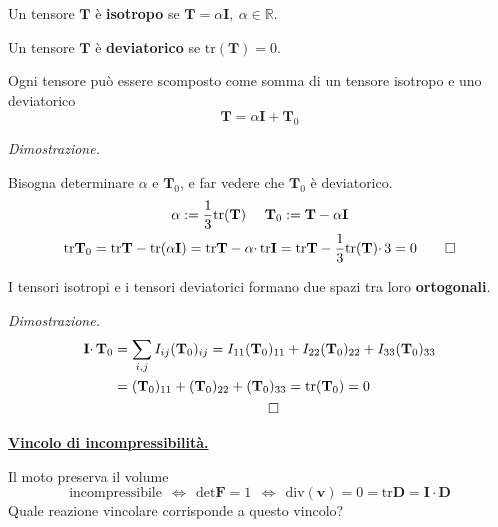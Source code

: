 \documentclass[10pt,a4paper,twoside]{book}
\begin{document}

\begin{oss}
Un tensore $\mathbf{T}$ è \textbf{isotropo} se $\mathbf{T} =\alpha \mathbf{I} ,\ \alpha \in \mathbb{R}$.

Un tensore $\mathbf{T}$ è \textbf{deviatorico} se $\mathrm{tr}(\mathbf{T}) =0$.

Ogni tensore può essere scomposto come somma di un tensore isotropo e uno deviatorico
\begin{equation*}
\boxed{\mathbf{T} =\alpha \mathbf{I} +\mathbf{T}_{0}}
\end{equation*}
\end{oss}
\textit{Dimostrazione.}

Bisogna determinare $\alpha $ e $\mathbf{T}_{0}$, e far vedere che $\mathbf{T}_{0}$ è deviatorico.
\begin{gather*}
\alpha :=\frac{1}{3}\mathrm{tr}(\mathbf{T}) \ \ \ \ \mathbf{T}_{0} :=\mathbf{T} -\alpha \mathbf{I}\\
\mathrm{tr}\mathbf{T}_{0} =\mathrm{tr}\mathbf{T} -\mathrm{tr}( \alpha \mathbf{I}) =\mathrm{tr}\mathbf{T} -\alpha \cdotp \mathrm{tr}\mathbf{I} =\mathrm{tr}\mathbf{T} -\frac{1}{3}\mathrm{tr(}\mathbf{T}\mathrm{)} \cdotp 3=0\qed 
\end{gather*}

\begin{oss}
I tensori isotropi e i tensori deviatorici formano due spazi tra loro \textbf{ortogonali}.
\end{oss}
\textit{Dimostrazione.}
\begin{gather*}
\begin{aligned}
\mathbf{I} \cdotp \mathbf{T}_{0} & =\sum _{i,j} I_{ij}(\mathbf{T}_{0})_{ij} =I_{11}(\mathbf{T}_{0})_{11} +I_{22}(\mathbf{T}_{0})_{22} +I_{33}(\mathbf{T}_{0})_{33}\\
 & =(\mathbf{T}_{0})_{11} +(\mathbf{T}_{0})_{22} +(\mathbf{T}_{0})_{33} =\mathrm{tr}(\mathbf{T}_{0}) =0
\end{aligned}\\
\qed 
\end{gather*}


\underline{\textbf{Vincolo di incompressibilità.}}

Il moto preserva il volume
\begin{equation*}
\text{incompressibile} \ \ \Leftrightarrow \ \ \mathrm{det}\mathbf{F} =1\ \ \Leftrightarrow \ \ \mathrm{div}(\mathbf{v}) =0=\mathrm{tr}\mathbf{D} =\mathbf{I} \cdotp \mathbf{D}
\end{equation*}
Quale reazione vincolare corrisponde a questo vincolo?
\end{document}
